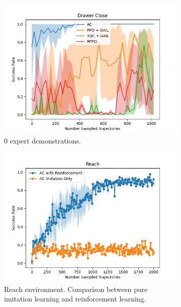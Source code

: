 \begin{figure}[htbp]
\begin{subfigure}[t]{0.32\textwidth}
      \includegraphics[width=\textwidth]{images/0/Drawer Close.png}
      \caption{0 expert demonstrations.}
      \label{fig:drawerclose}
    \end{subfigure}
    \medskip
    \begin{subfigure}[t]{0.45\textwidth}
      \includegraphics[width=\textwidth]{images/1_2000_imi/Reach.png}
      \caption{Reach environment. Comparison between pure imitation learning and reinforcement learning.}
    \end{subfigure}
    \hfill
    \begin{subfigure}[t]{0.45\textwidth}

\end{subfigure}
\end{figure}
